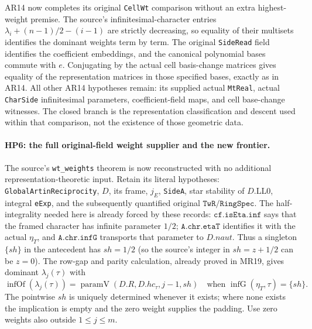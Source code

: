 AR14 now completes its original \texttt{CellWt} comparison without
an extra highest-weight premise.  The source's infinitesimal-character
entries $\lambda_i+(n-1)/2-(i-1)$ are strictly decreasing, so equality
of their multisets identifies the dominant weights term by term.
The original \texttt{SideRead} field identifies the coefficient
embeddings, and the canonical polynomial bases commute with $e$.
Conjugating by the actual cell basis-change matrices gives equality
of the representation matrices in those specified bases, exactly
as in AR14.  All other AR14 hypotheses remain: its supplied actual
\texttt{MtReal}, actual \texttt{CharSide} infinitesimal parameters,
coefficient-field maps, and cell base-change witnesses.  The closed
branch is the representation classification and descent used within
that comparison, not the existence of those geometric data.

\paragraph{HP6: the full original-field weight supplier and the new frontier.}
\label{claim:HP6}
The source's \texttt{wt\_weights} theorem is now reconstructed with
no additional representation-theoretic input.  Retain its literal
hypotheses: \texttt{GlobalArtinReciprocity}, $D$, its frame, $j_E$,
\texttt{SideA}, star stability of $D.\mathrm{LL0}$, integral
\texttt{eExp}, and the subsequently quantified original
$\texttt{TwR}/\texttt{RingSpec}$.  The half-integrality needed here is already forced by these records:
$\texttt{cf.isEta.inf}$ says that the framed character has infinite
parameter $1/2$; $\texttt{A.chr.etaT}$ identifies it with the actual
$\eta_T$, and $\texttt{A.chr.infG}$ transports that parameter to
$D.naut$.  Thus a singleton $\{sh\}$ in the antecedent has
$sh=1/2$ (so the source's integer in $sh=z+1/2$ can be $z=0$).
The row-gap and parity calculation, already proved in MR19, gives dominant
$\lambda_j(\tau)$ with
\[
 \operatorname{infOf}(\lambda_j(\tau))
       =\operatorname{paramV}(D.R,D.hc_\tau,j-1,sh)
 \quad\text{when }\operatorname{infG}(\eta_T,\tau)=\{sh\}.
 \tag{HP.19}
\]
The pointwise $sh$ is uniquely determined whenever it exists; where
none exists the implication is empty and the zero weight supplies
the padding.  Use zero weights also outside $1\le j\le m$.

